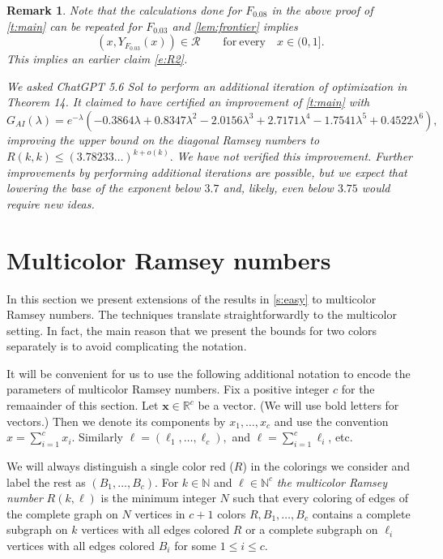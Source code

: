 \documentclass[reqno,final,12pt]{amsart}
\newtheorem{rem}[thm]{Remark}
\newcommand{\mc}[1]{\mathcal{#1}}
\newcommand{\bb}[1]{\mathbb{#1}}
\newcommand{\bl}[1]{\boldsymbol{#1}}
\begin{document}
\begin{rem}\label{r:final}
	Note that the calculations done for $F_{0.08}$ in the above proof of \cref{t:main} can be repeated for $F_{0.03}$ and \cref{lem:frontier} implies  \begin{equation}\label{e:R3}
(x, Y_{F_{0.03}}(x)) \in \mc{R} \qquad \mathrm{for\: every} \quad x \in (0,1]. 
	\end{equation} This implies an earlier claim \eqref{e:R2}. 
	
	We asked ChatGPT 5.6 Sol to perform an additional iteration of optimization in Theorem 14. It claimed to have certified an improvement of \cref{t:main} with 
	$$G_{AI}(\lambda) = e^{-\lambda}(-0.3864\lambda+0.8347\lambda^2
	-2.0156\lambda^3+2.7171\lambda^4-1.7541\lambda^5
	+0.4522\lambda^6),$$
	improving the upper bound on the diagonal Ramsey numbers  to  $R(k,k) \leq (3.78233\ldots)^{k+o(k)}.$
	We have not verified this improvement. Further improvements by performing additional iterations are possible, but we expect that lowering the base of the exponent below $3.7$  and, likely, even below $3.75$ would require new ideas.
\end{rem}	
	


\section{Multicolor Ramsey numbers}\label{s:multi}

In this section we  present extensions of the results in \cref{s:easy}  to multicolor Ramsey numbers. The techniques translate straightforwardly to the multicolor setting. In fact, the main reason that we present the bounds for two colors separately is to avoid complicating the notation.   

It will be convenient for us to use the following additional notation to encode the parameters of multicolor Ramsey numbers. Fix a positive integer $c$ for the remaainder of this section. Let $\bl{x} \in \bb{R}^c$ be a vector. (We will use bold letters for vectors.) Then we denote its components by $x_1,\ldots,x_c$ and use the convention $x =\sum_{i=1}^cx_i$. Similarly $\bl{\ell}=(\ell_1,\ldots,\ell_c),$ and $\ell = \sum_{i=1}^c\ell_i$, etc. 

We will always distinguish a single color red ($R$) in the colorings we consider and  label the rest as $(B_1,\dots,B_c)$. For $k \in \bb{N}$ and  $\bl{\ell}\in \bb{N}^c$
\emph{the multicolor Ramsey number} $R(k,\bl{\ell})$ is the minimum integer $N$ such that every coloring of edges of the complete graph on $N$ vertices in $c+1$ colors $R,B_1,\dots,B_c$ contains a complete subgraph on $k$ vertices with all edges colored $R$ or a complete subgraph on $\ell_i$ vertices with all edges colored $B_i$ for some $1 \leq i \leq c$.
\end{document}
